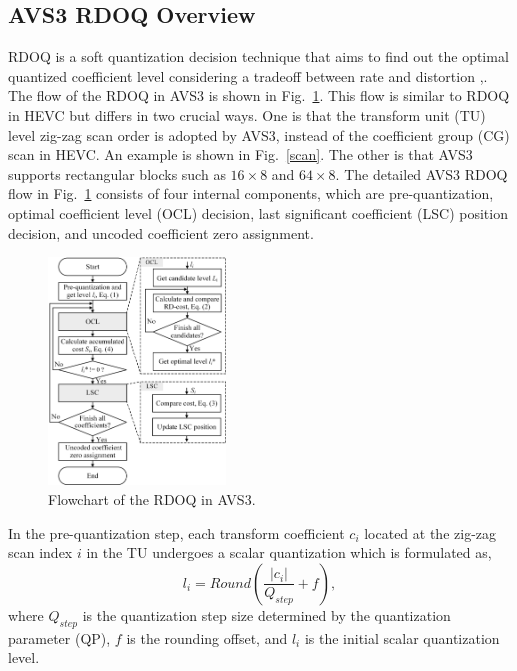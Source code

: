 \documentclass[lettersize,journal]{IEEEtran}
\begin{document}
\subsection{AVS3 RDOQ Overview}
\label{sec:2A}
RDOQ is a soft quantization decision technique that aims to find out the optimal quantized coefficient level considering a tradeoff between rate and distortion  \cite{zhao2023scanline},\cite{huang2023rate}. The flow of the RDOQ in AVS3 is shown in Fig.~\ref{rdoq process}. This flow is similar to RDOQ in HEVC \cite{cui2017Laplacedistributionbased} but differs in two crucial ways. One is that the transform unit (TU) level zig-zag scan order is adopted by AVS3, instead of the coefficient group (CG) scan in HEVC. An example is shown in Fig.~\ref{scan}. The other is that AVS3 supports rectangular blocks such as $16\times8$ and $64\times8$. The detailed AVS3 RDOQ flow in Fig.~\ref{rdoq process} consists of four internal components, which are pre-quantization, optimal coefficient level (OCL) decision, last significant coefficient (LSC) position decision, and uncoded coefficient zero assignment. 
\par
\begin{figure}[!h]
	\centering
	\centerline{\includegraphics[width=0.42\textwidth]{figure/OriRDOQ.png}} 
	\caption{Flowchart of the RDOQ in AVS3.}
	\label{rdoq process} %
\end{figure}
In the pre-quantization step, each transform coefficient $c_{i}$ located at the zig-zag scan index $i$ in the TU undergoes a scalar quantization which is formulated as, 
\begin{equation}
\label{round}
l _{i} = Round\left ( \frac{\left | c_{i}  \right | }{Q_{step} } +  f \right ),
\end{equation}
where $Q_{step}$ is the quantization step size determined by the quantization parameter (QP), $f$ is the rounding offset, and $l _{i}$ is the initial scalar quantization level. 
\end{document}
